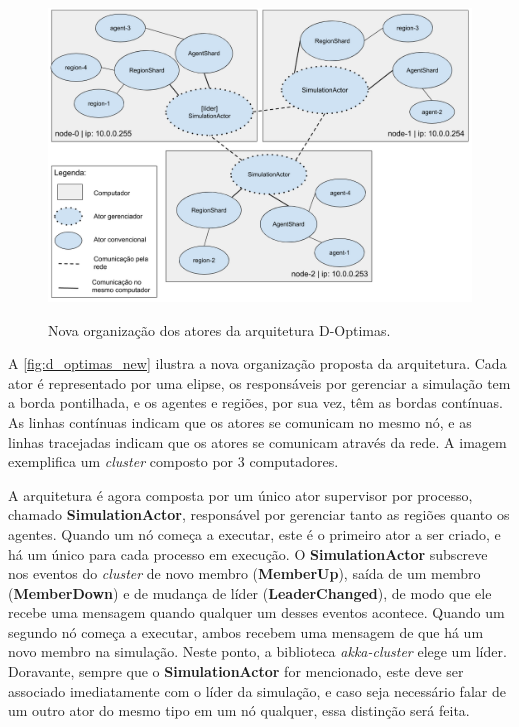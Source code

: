  \begin{figure}
     \centering
     \caption{Nova organização dos atores da arquitetura D-Optimas.}
     \includegraphics[scale=0.45]{imagens/d-optimas-new.png}
     \label{fig:d_optimas_new}
 \end{figure}
 
 A \autoref{fig:d_optimas_new} ilustra a nova organização proposta da arquitetura. Cada ator é representado por uma elipse, os responsáveis por gerenciar a simulação tem a borda pontilhada, e os agentes e regiões, por sua vez, têm as bordas contínuas. As linhas contínuas indicam que os atores se comunicam no mesmo nó, e as linhas tracejadas indicam que os atores se comunicam através da rede. A imagem exemplifica um \textit{cluster} composto por 3 computadores. 
 
 A arquitetura é agora composta por um único ator supervisor por processo, chamado \textbf{SimulationActor}, responsável por gerenciar tanto as regiões quanto os agentes. Quando um nó começa a executar, este é o primeiro ator a ser criado, e há um único para cada processo em execução. O \textbf{SimulationActor} subscreve nos eventos do \textit{cluster} de novo membro (\textbf{MemberUp}), saída de um membro (\textbf{MemberDown}) e de mudança de líder (\textbf{LeaderChanged}), de modo que ele recebe uma mensagem quando qualquer um desses eventos acontece. Quando um segundo nó começa a executar, ambos recebem uma mensagem de que há um novo membro na simulação. Neste ponto, a biblioteca \textit{akka-cluster} elege um líder. Doravante, sempre que o \textbf{SimulationActor} for mencionado, este deve ser associado imediatamente com o líder da simulação, e caso seja necessário falar de um outro ator do mesmo tipo em um nó qualquer, essa distinção será feita. 
  
